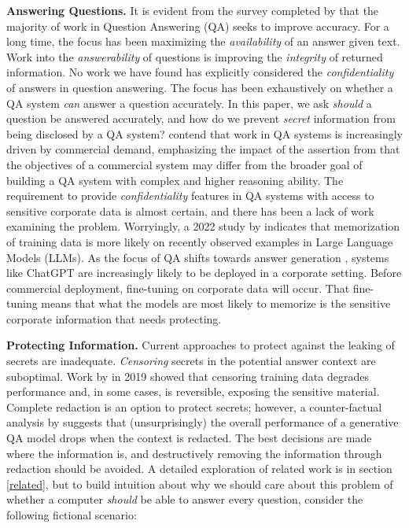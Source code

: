 \documentclass[11pt]{article}
\begin{document}
\textbf{Answering Questions.} It is evident from the survey completed by \citeauthor{Rogers2023} that the majority of work in Question Answering (QA) seeks to improve accuracy. For a long time, the focus has been maximizing the \textit{availability} of an answer given text. Work into the \textit{answerability} of questions is improving the \textit{integrity} of returned information. No work we have found has explicitly considered the \textit{confidentiality} of answers in question answering. The focus has been exhaustively on whether a QA system \textit{can} answer a question accurately. In this paper, we ask \textit{should} a question be answered accurately, and how do we prevent \textit{secret} information from being disclosed by a QA system? \citeauthor{Rogers2023} contend that work in QA systems is increasingly driven by commercial demand, emphasizing the impact of the assertion from \citeauthor{Roy2021} that the objectives of a commercial system may differ from the broader goal of building a QA system with complex and higher reasoning ability. The requirement to provide \textit{confidentiality} features in QA systems with access to sensitive corporate data is almost certain, and there has been a lack of work examining the problem. Worryingly, a 2022 study by \citeauthor{Jagielski2022} indicates that memorization of training data is more likely on recently observed examples in Large Language Models (LLMs). As the focus of QA shifts towards answer generation \cite{Baradaran2022}, systems like ChatGPT \cite{OpenAI2022} are increasingly likely to be deployed in a corporate setting. Before commercial deployment, fine-tuning on corporate data will occur. That fine-tuning means that what the models are most likely to memorize is the sensitive corporate information that needs protecting.

\textbf{Protecting Information. }Current approaches to protect against the leaking of secrets are inadequate. \textit{Censoring} secrets in the potential answer context are suboptimal. Work by \citeauthor{Song2019} in 2019 showed that censoring training data degrades performance and, in some cases, is reversible, exposing the sensitive material. Complete redaction is an option to protect secrets; however, a counter-factual analysis by \citeauthor{Kandpal2022} suggests that (unsurprisingly) the overall performance of a generative QA model drops when the context is redacted. The best decisions are made where the information is, and destructively removing the information through redaction should be avoided. A detailed exploration of related work is in section \ref{related}, but to build intuition about why we should care about this problem of whether a computer \textit{should} be able to answer every question, consider the following fictional scenario: 
\end{document}
